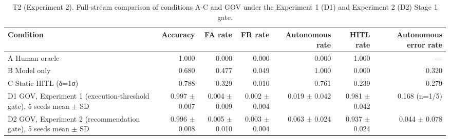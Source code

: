 \begin{table}[t]\centering\small
\caption{T2 (Experiment 2). Full-stream comparison of conditions A-C and GOV under the Experiment 1 (D1) and Experiment 2 (D2) Stage 1 gate.}
\label{tab:T2_main_comparison_exp2}
\begin{tabular}{lrrrrrr}\hline
Condition & Accuracy & FA rate & FR rate & Autonomous rate & HITL rate & Autonomous error rate \\ \hline
A Human oracle & 1.000 & 0.000 & 0.000 & 0.000 & 1.000 & — \\
B Model only & 0.680 & 0.477 & 0.049 & 1.000 & 0.000 & 0.320 \\
C Static HITL (δ=1σ) & 0.788 & 0.329 & 0.010 & 0.761 & 0.239 & 0.279 \\
D1 GOV, Experiment 1 (execution-threshold gate), 5 seeds mean $\pm$ SD & 0.997 $\pm$ 0.007 & 0.004 $\pm$ 0.009 & 0.002 $\pm$ 0.004 & 0.019 $\pm$ 0.042 & 0.981 $\pm$ 0.042 & 0.168 (n=1/5) \\
D2 GOV, Experiment 2 (recommendation gate), 5 seeds mean $\pm$ SD & 0.996 $\pm$ 0.008 & 0.005 $\pm$ 0.010 & 0.003 $\pm$ 0.004 & 0.063 $\pm$ 0.024 & 0.937 $\pm$ 0.024 & 0.044 $\pm$ 0.078 \\
\hline\end{tabular}
\end{table}
